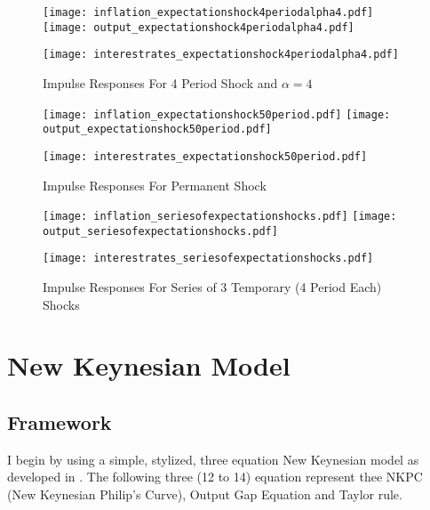\documentclass[12pt]{article}
\newcommand{\1}{\mathbbm 1}
\begin{document}
\begin{figure}[H]
	\texttt{[image: inflation\_expectationshock4periodalpha4.pdf]}
	\hfill
	\texttt{[image: output\_expectationshock4periodalpha4.pdf]}
	\hfill
	\begin{Center}
		\texttt{[image: interestrates\_expectationshock4periodalpha4.pdf]}
	\end{Center}
	\caption{Impulse Responses For 4 Period Shock and $\alpha = 4$}
\end{figure}
	
	\begin{figure}[H]
		\texttt{[image: inflation\_expectationshock50period.pdf]}
		\hfill
		\texttt{[image: output\_expectationshock50period.pdf]}
		\hfill
		\begin{Center}
			\texttt{[image: interestrates\_expectationshock50period.pdf]}
		\end{Center}
		\caption{Impulse Responses For Permanent Shock}
	\end{figure}


	\begin{figure}[H]
	\texttt{[image: inflation\_seriesofexpectationshocks.pdf]}
	\hfill
	\texttt{[image: output\_seriesofexpectationshocks.pdf]}
	\hfill
	\begin{Center}
		\texttt{[image: interestrates\_seriesofexpectationshocks.pdf]}
	\end{Center}
	\caption{Impulse Responses For Series of 3 Temporary (4 Period Each) Shocks}
\end{figure}
		
		
		\newpage
		
		
			
		
		\section{New Keynesian Model}
		
		\subsection{Framework}
		
		I begin by using a simple, stylized, three equation New Keynesian model as developed in \cite{gali2015book}. The following three (12 to 14) equation represent thee NKPC (New Keynesian Philip's Curve), Output Gap Equation and Taylor rule.
		
\end{document}
